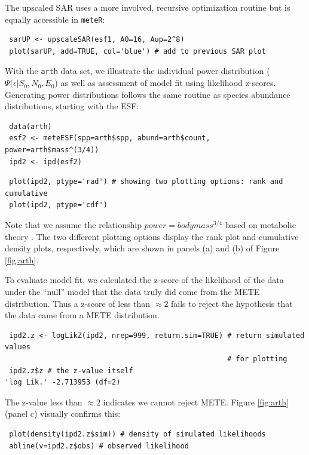 The upscaled SAR uses a more involved, recursive optimization routine
\citep[see eqns (7.70) and (7.71) in][]{Harte:2011ut} but is equally
accessible in \texttt{meteR}:

\begin{verbatim}
 sarUP <- upscaleSAR(esf1, A0=16, Aup=2^8)
 plot(sarUP, add=TRUE, col='blue') # add to previous SAR plot
\end{verbatim}


With the \texttt{arth} data set, we illustrate the individual power
distribution ($\Psi(\epsilon | S_0, N_0, E_0$) as well as assessment
of model fit using likelihood z-scores. Generating power distributions
follows the same routine as species abundance distributions, starting
with the ESF:

\begin{verbatim}
 data(arth)
 esf2 <- meteESF(spp=arth$spp, abund=arth$count, power=arth$mass^(3/4))
 ipd2 <- ipd(esf2)
\end{verbatim}

\begin{verbatim}
 plot(ipd2, ptype='rad') # showing two plotting options: rank and cumulative
 plot(ipd2, ptype='cdf')
\end{verbatim}

Note that we assume the relationship $power=body mass^{3/4}$ based on
metabolic theory \citep{brown2004metab}. The two different plotting
options display the rank plot and cumulative density plots,
respectively, which are shown in panels (a) and (b) of Figure
\ref{fig:arth}.

To evaluate model fit, we calculated the z-score of the likelihood of
the data under the ``null'' model that the data truly did come from
the METE distribution. Thus a z-score of less than $\approx 2$ fails
to reject the hypothesis that the data came from a METE distribution.
\begin{verbatim}
 ipd2.z <- logLikZ(ipd2, nrep=999, return.sim=TRUE) # return simulated values 
                                                    # for plotting
 ipd2.z$z # the z-value itself
'log Lik.' -2.713953 (df=2)
\end{verbatim}
The z-value less than $\approx 2$ indicates we cannot reject METE.
Figure \ref{fig:arth} (panel c) visually confirms this:
\begin{verbatim}
 plot(density(ipd2.z$sim)) # density of simulated likelihoods
 abline(v=ipd2.z$obs) # observed likelihood
\end{verbatim}

